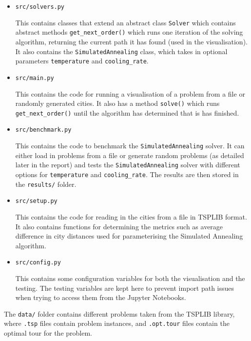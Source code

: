 \documentclass{article}
\begin{document}
\begin{itemize}
    \item \texttt{src/solvers.py} 
    
    This contains classes that extend an abstract class \texttt{Solver} which contains abstract methods \texttt{get\_next\_order()} which runs one iteration of the solving algorithm, returning the current path it has found (used in the visualisation).
    It also contains the \texttt{SimulatedAnnealing} class, which takes in optional parameters \texttt{temperature} and \texttt{cooling\_rate}.
    
    \item \texttt{src/main.py} 
    
    This contains the code for running a visualisation of a problem from a file or randomly generated cities.
    It also has a method \texttt{solve()} which runs \texttt{get\_next\_order()} until the algorithm has determined that is has finished.
    
    \item \texttt{src/benchmark.py}
    
    This contains the code to benchmark the \texttt{SimulatedAnnealing} solver.
    It can either load in problems from a file or generate random problems (as detailed later in the report) and tests the \texttt{SimulatedAnnealing} solver with different options for \texttt{temperature} and \texttt{cooling\_rate}.
    The results are then stored in the \texttt{results/} folder.
    
    \item \texttt{src/setup.py}
    
    This contains the code for reading in the cities from a file in TSPLIB format.
    It also contains functions for determining the metrics such as average difference in city distances used for parameterising the Simulated Annealing algorithm.
    
    \item \texttt{src/config.py}
    
    This contains some configuration variables for both the visualisation and the testing.
    The testing variables are kept here to prevent import path issues when trying to access them from the Jupyter Notebooks.
    
\end{itemize}

The \texttt{data/} folder contains different problems taken from the TSPLIB library, where \texttt{.tsp} files contain problem instances, and \texttt{.opt.tour} files contain the optimal tour for the problem.
\\
\end{document}
